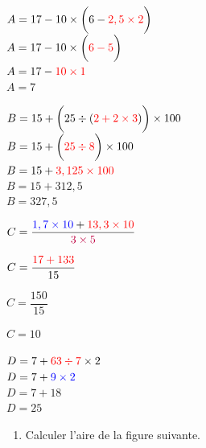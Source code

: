 \documentclass[a4paper]{book}
\begin{document}
{    
    \begin{exercice}        
        \begin{minipage}{0.23\linewidth}
            $A=17-10\times\bigg(6-\textcolor{red}{2,5\times2}\bigg)$\\
            $A=17-10\times\bigg(\textcolor{red}{6-5}\bigg)$\\
            $A=17-\textcolor{red}{10\times1}$\\
            $A=7$
        \end{minipage}
        \hfill
        \vline
        \hfill
        \begin{minipage}{0.23\linewidth}
            $B=15+\bigg(25\div(\textcolor{red}{2+2\times3})\bigg)\times100$\\
            $B=15+\bigg(\textcolor{red}{25\div8}\bigg)\times100$\\
            $B=15+\textcolor{red}{3,125\times100}$\\
            $B=15+312,5$\\
            $B=327,5$
        \end{minipage}
        \hfill
        \vline
        \hfill
        \begin{minipage}{0.23\linewidth}
            $C=\dfrac{\textcolor{blue}{1,7\times10}+\textcolor{red}{13,3\times10}}{\textcolor{purple}{3\times5}}$

            \smallskip

            $C=\dfrac{\textcolor{red}{17+133}}{15}$

            \smallskip

            $C=\dfrac{150}{15}$

            \smallskip

            $C=10$
        \end{minipage}
        \hfill
        \vline
        \hfill
        \begin{minipage}{0.23\linewidth}
            $D=7+\textcolor{red}{63\div7}\times2$\\
            $D=7+\textcolor{blue}{9\times2}$\\
            $D=7+18$\\
            $D=25$
        \end{minipage}
    \end{exercice}


    \begin{exercice}
        \begin{enumerate}[leftmargin=*]
            \item Calculer l'aire de la figure suivante.
            

\end{enumerate}
\end{exercice}}
\end{document}
